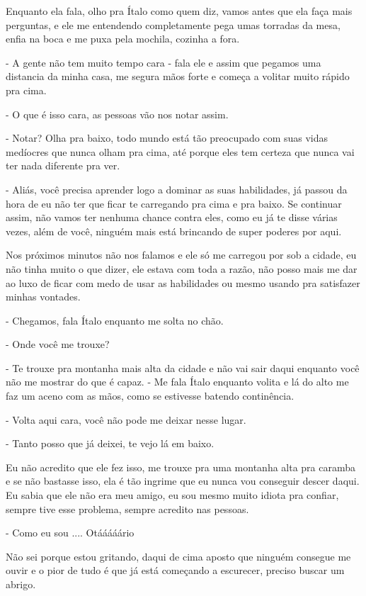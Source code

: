 Enquanto ela fala, olho pra Ítalo como quem diz, vamos antes que ela faça mais perguntas, e ele me entendendo completamente pega umas torradas da mesa, enfia na boca e me puxa pela mochila, cozinha a fora.

- A gente não tem muito tempo cara - fala ele e assim que pegamos uma distancia da minha casa, me segura mãos forte e começa a volitar muito rápido pra cima.

- O que é isso cara, as pessoas vão nos notar assim.

- Notar? Olha pra baixo, todo mundo está tão preocupado com suas vidas medíocres que nunca olham pra cima, até porque eles tem certeza que nunca vai ter nada diferente pra ver.

- Aliás, você precisa aprender logo a dominar as suas habilidades, já passou da hora de eu não ter que ficar te carregando pra cima e pra baixo. Se continuar assim, não vamos ter nenhuma chance contra eles, como eu já te disse várias vezes, além de você, ninguém mais está brincando  de super poderes por aqui.

Nos próximos minutos não nos falamos e ele só me carregou por sob a cidade, eu não tinha muito o que dizer, ele estava com toda a razão, não posso mais me dar ao luxo de ficar com medo de usar as habilidades ou mesmo usando pra satisfazer minhas vontades.

- Chegamos, fala Ítalo enquanto me solta no chão.

- Onde você me trouxe?

- Te trouxe pra montanha mais alta da cidade e não vai sair daqui enquanto você não me mostrar do que é capaz. - Me fala Ítalo enquanto volita e lá do alto me faz um aceno com as mãos, como se estivesse batendo continência.

- Volta aqui cara, você não pode me deixar nesse lugar.

- Tanto posso que já deixei, te vejo lá em baixo.

Eu não acredito que ele fez isso, me trouxe pra uma montanha alta pra caramba e se não bastasse isso, ela é tão ingrime que eu nunca vou conseguir descer daqui. Eu sabia que ele não era meu amigo, eu sou mesmo muito idiota pra confiar, sempre tive esse problema, sempre acredito nas pessoas.

- Como eu sou .... Otááááário

Não sei porque estou gritando, daqui de cima aposto que ninguém consegue me ouvir e o pior de tudo é que já está começando a escurecer, preciso buscar um abrigo.

